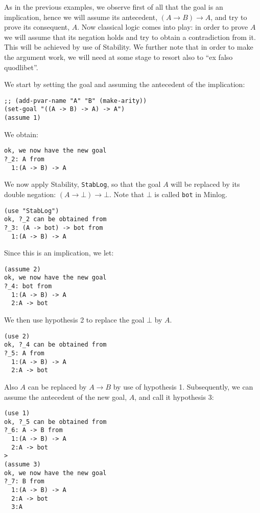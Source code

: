 \documentclass[12pt]{amsart}
\newcommand{\falsum}{\bot}
\newcommand{\inquotes}[1]{``#1''}
\newcommand{\mi}{Minlog}
\newcommand{\ob}{\to}
\begin{document}
As in the previous examples, we observe first of all that the goal is
an implication, hence we will assume its antecedent, $(A \ob B) \ob
A$, and try to prove its consequent, $A$.  Now classical logic comes
into play: in order to prove $A$ we will assume that its negation
holds and try to obtain a contradiction from it.  This will be
achieved by use of Stability.  We further note that in order to make
the argument work, we will need at some stage to resort also to
\inquotes{ex falso quodlibet}.

We start by setting the goal and assuming the antecedent of the
implication:
\begin{verbatim}
;; (add-pvar-name "A" "B" (make-arity))
(set-goal "((A -> B) -> A) -> A")
(assume 1)
\end{verbatim}

We obtain:
\begin{verbatim}
ok, we now have the new goal
?_2: A from
  1:(A -> B) -> A
\end{verbatim}

We now apply Stability, \texttt{StabLog}, so that the goal $A$ will
be replaced by its double negation: $(A \ob \falsum) \ob \falsum$.
Note that $\falsum$ is called \texttt{bot} in \mi.

\begin{verbatim}
(use "StabLog")
ok, ?_2 can be obtained from
?_3: (A -> bot) -> bot from
  1:(A -> B) -> A
\end{verbatim}

Since this is an implication, we let:
\begin{verbatim}
(assume 2)
ok, we now have the new goal
?_4: bot from
  1:(A -> B) -> A
  2:A -> bot
\end{verbatim}

We then use hypothesis 2 to replace the goal $\falsum$ by $A$.
\begin{verbatim}
(use 2)
ok, ?_4 can be obtained from
?_5: A from
  1:(A -> B) -> A
  2:A -> bot
\end{verbatim}

Also $A$ can be replaced by $A \ob B$ by use of hypothesis 1.
Subsequently, we can assume the antecedent of the new goal, $A$, and
call it hypothesis 3:
\begin{verbatim}
(use 1)
ok, ?_5 can be obtained from
?_6: A -> B from
  1:(A -> B) -> A
  2:A -> bot
>
(assume 3)
ok, we now have the new goal
?_7: B from
  1:(A -> B) -> A
  2:A -> bot
  3:A
\end{verbatim}
\end{document}
